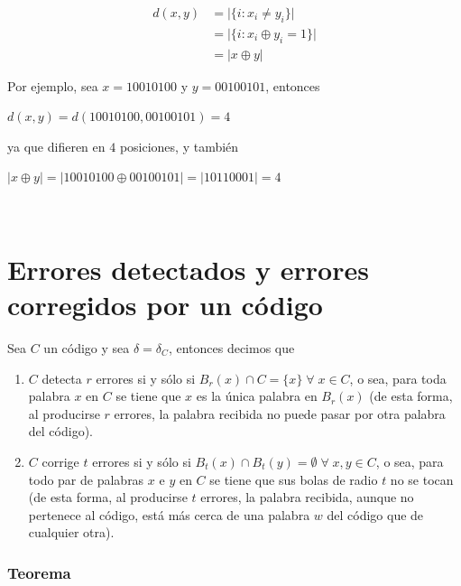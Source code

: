 \documentclass[10pt,a4paper]{article}
\begin{document}
\begin{center}
\begin{align*}
d(x, y) &= \lvert \{i: x_i \neq y_i\}\rvert \\
&= \lvert \{i : x_i \oplus y_i = 1\}\rvert\\
&= \lvert x \oplus y \rvert
\end{align*}
\end{center}

Por ejemplo, sea $x = 10010100$ y $y = 00100101$, entonces

\begin{center}
$d(x, y) = d(10010100, 00100101) = 4$
\end{center}

ya que difieren en $4$ posiciones, y también

\begin{center}
$\lvert x \oplus y \rvert = \lvert 10010100 \oplus 00100101\rvert
= \lvert 10110001\rvert = 4$
\end{center}

\begin{center}
 
\end{center}

\section*{Errores detectados y errores corregidos por un código}

Sea $C$ un código y sea $\delta = \delta_C$, entonces decimos que

\begin{enumerate}

	\item $C$ detecta $r$ errores si y sólo si $B_r(x) \cap C = \{x\} \;\forall\; x \in C$, o sea, para toda palabra $x$ en $C$ se tiene que $x$ es la única palabra en $B_r(x)$ (de esta forma, al producirse $r$ errores, la palabra recibida no puede pasar por otra palabra del código).
	\item $C$ corrige $t$ errores si y sólo si $B_t(x) \cap B_t (y) = \emptyset \; \forall \;x, y \in C$, o sea, para todo par de palabras $x$ e $y$ en $C$ se tiene que sus bolas de radio $t$ no se tocan (de esta forma, al producirse $t$ errores, la palabra recibida, aunque no pertenece al código, está más cerca de una palabra $w$ del código que de cualquier otra).
\end{enumerate}

\subsubsection*{Teorema}
\end{document}
